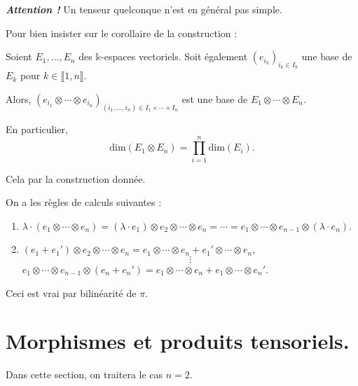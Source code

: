\documentclass{../../notes}
\begin{document}
  \textbf{\textit{Attention !}}
  Un tenseur quelconque n'est en général pas simple.

  Pour bien insister sur le corollaire de la construction :
  \begin{crlr}
    Soient $E_1, \ldots, E_n$ des $\mathds{k}$-espaces vectoriels.
    Soit également $(e_{i_k})_{i_k \in I_k}$ une base de $E_k$ pour $k \in \llbracket 1,n\rrbracket$.

    Alors, $(e_{i_1} \otimes \cdots \otimes e_{i_n})_{(i_1, \ldots, i_n) \in I_1 \times \cdots \times I_n}$ 
    est une base de $E_1 \otimes \cdots \otimes E_n$.

    En particulier, \[
      \mathrm{dim}(E_1 \otimes E_n) = \prod_{i = 1}^n \mathrm{dim}(E_i)
    .\]
  \end{crlr}
  \begin{prv}
    Cela par la construction donnée.
  \end{prv}

  On a les règles de calculs suivantes :
  \begin{enumerate}
    \item {\small $\lambda \cdot (e_1 \otimes \cdots \otimes e_n) = (\lambda \cdot e_1) \otimes e_2 \otimes \cdots \otimes e_n = \cdots = e_1 \otimes \cdots \otimes e_{n-1}  \otimes (\lambda \cdot e_n)$.}
    \item $(e_1 + e_1') \otimes e_2 \otimes \cdots \otimes e_n = e_1 \otimes \cdots \otimes e_n + e_1' \otimes \cdots \otimes e_n$, \[
    \vdots
    \]
      $e_1 \otimes \cdots \otimes e_{n-1} \otimes (e_n + e_n') = e_1 \otimes \cdots \otimes e_n + e_1 \otimes \cdots \otimes e_n'$.
  \end{enumerate}

  Ceci est vrai par bilinéarité de $\pi$.

  \section{Morphismes et produits tensoriels.}

  Dans cette section, on traitera le cas $n = 2$.
\end{document}
